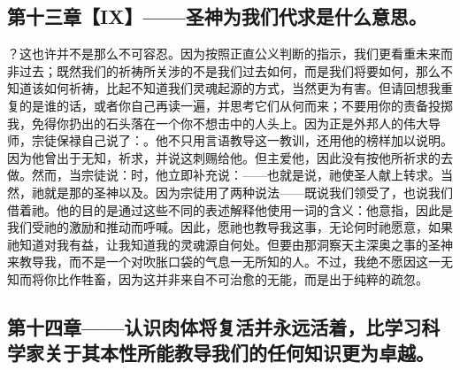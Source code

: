 
\subsection{第十三章【IX】——圣神为我们代求是什么意思。}

？这也许并不是那么不可容忍。因为按照正直公义判断的指示，我们更看重未来而非过去；既然我们的祈祷所关涉的不是我们过去如何，而是我们将要如何，那么不知道该如何祈祷，比起不知道我们灵魂起源的方式，当然更为有害。但请回想我重复的是谁的话，或者你自己再读一遍，并思考它们从何而来；不要用你的责备投掷我，免得你扔出的石头落在一个你不想击中的人头上。因为正是外邦人的伟大导师，宗徒保禄自己说了：。他不只用言语教导这一教训，还用他的榜样加以说明。因为他曾出于无知，祈求，并说这刺赐给他。但主爱他，因此没有按他所祈求的去做。然而，当宗徒说：时，他立即补充说：——也就是说，祂使圣人献上转求。当然，祂就是那的圣神以及。因为宗徒用了两种说法——既说我们领受了，也说我们借着祂。他的目的是通过这些不同的表述解释他使用一词的含义：他意指，因此是我们受祂的激励和推动而呼喊。因此，愿祂也教导我这事，无论何时祂愿意，如果祂知道对我有益，让我知道我的灵魂源自何处。但要由那洞察天主深奥之事的圣神来教导我，而不是一个对吹胀口袋的气息一无所知的人。不过，我绝不愿因这一无知而将你比作牲畜，因为这并非来自不可治愈的无能，而是出于纯粹的疏忽。\par


\subsection{第十四章——认识肉体将复活并永远活着，比学习科学家关于其本性所能教导我们的任何知识更为卓越。}


